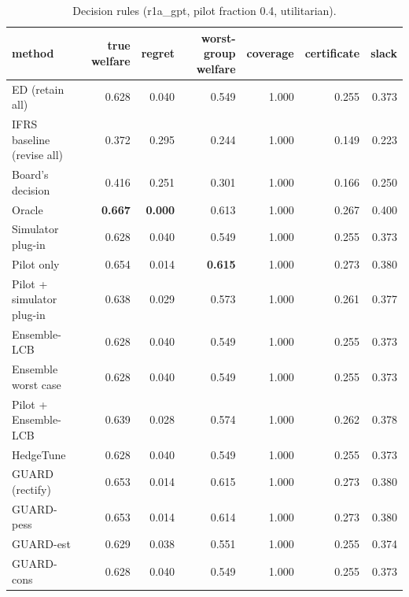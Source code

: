 \begin{table}[t]
\centering
\small
\begin{tabular}{lrrrrrr}
\toprule
method & true welfare & regret & worst-group welfare & coverage & certificate & slack \\
\midrule
ED (retain all) & 0.628 & 0.040 & 0.549 & 1.000 & 0.255 & 0.373 \\
IFRS baseline (revise all) & 0.372 & 0.295 & 0.244 & 1.000 & 0.149 & 0.223 \\
Board's decision & 0.416 & 0.251 & 0.301 & 1.000 & 0.166 & 0.250 \\
Oracle & \textbf{0.667} & \textbf{0.000} & 0.613 & 1.000 & 0.267 & 0.400 \\
Simulator plug-in & 0.628 & 0.040 & 0.549 & 1.000 & 0.255 & 0.373 \\
Pilot only & 0.654 & 0.014 & \textbf{0.615} & 1.000 & 0.273 & 0.380 \\
Pilot + simulator plug-in & 0.638 & 0.029 & 0.573 & 1.000 & 0.261 & 0.377 \\
Ensemble-LCB & 0.628 & 0.040 & 0.549 & 1.000 & 0.255 & 0.373 \\
Ensemble worst case & 0.628 & 0.040 & 0.549 & 1.000 & 0.255 & 0.373 \\
Pilot + Ensemble-LCB & 0.639 & 0.028 & 0.574 & 1.000 & 0.262 & 0.378 \\
HedgeTune & 0.628 & 0.040 & 0.549 & 1.000 & 0.255 & 0.373 \\
GUARD (rectify) & 0.653 & 0.014 & 0.615 & 1.000 & 0.273 & 0.380 \\
GUARD-pess & 0.653 & 0.014 & 0.614 & 1.000 & 0.273 & 0.380 \\
GUARD-est & 0.629 & 0.038 & 0.551 & 1.000 & 0.255 & 0.374 \\
GUARD-cons & 0.628 & 0.040 & 0.549 & 1.000 & 0.255 & 0.373 \\
\bottomrule
\end{tabular}
\caption{Decision rules (r1a\_gpt, pilot fraction 0.4, utilitarian).}
\label{tab:methods-utilitarian}
\end{table}
